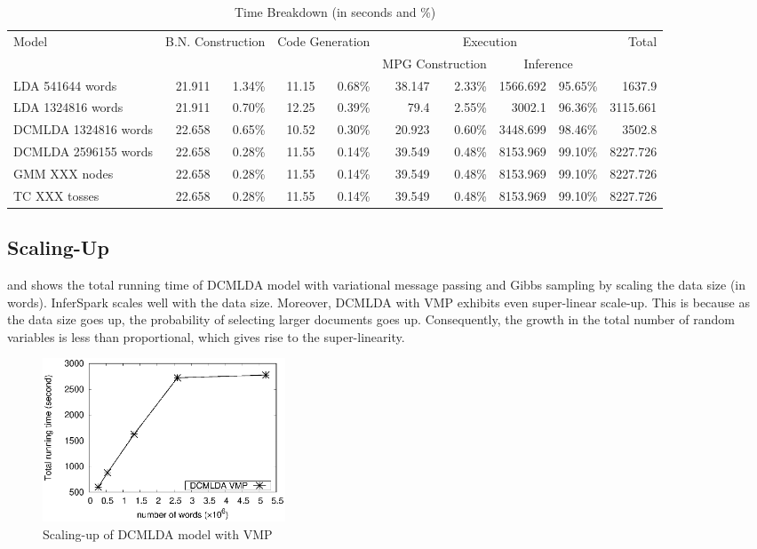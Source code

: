 \begin{table}
\caption{Time Breakdown (in seconds and \%)}
\label{breakdown}
\centering
\small
\begin{tabular}{|l||*{8}{r|}r|}
\hline
Model & \multicolumn{2}{c|}{B.N. Construction} & \multicolumn{2}{c|}{Code Generation}	& \multicolumn{4}{c|}{Execution} & Total \\\cline{6-9}
  & \multicolumn{2}{c|}{ } & \multicolumn{2}{c|}{ }	& \multicolumn{2}{c|}{MPG Construction} & \multicolumn{2}{c|}{Inference} &	 \\ \hline \hline
LDA 541644 words	& 21.911	& 1.34\%	& 11.15 &	0.68\%	& 38.147	& 2.33\% &	1566.692 & 95.65\%	& 1637.9 \\ \hline
LDA 1324816 words &	21.911 & 0.70\% & 12.25	& 0.39\% & 79.4 & 2.55\%	& 3002.1 & 96.36\% &	3115.661 \\ \hline
DCMLDA 1324816 words & 22.658 & 0.65\%	& 10.52 & 0.30\% &	20.923	& 0.60\% & 3448.699	& 98.46\% &	3502.8 \\ \hline
DCMLDA 2596155 words & 22.658 & 0.28\% & 11.55 & 0.14\%	& 39.549 & 0.48\%	& 8153.969 & 99.10\%	& 8227.726 \\ \hline
GMM XXX nodes & 22.658 & 0.28\% & 11.55 & 0.14\%	& 39.549 & 0.48\%	& 8153.969 & 99.10\%	& 8227.726 \\ \hline
TC XXX tosses & 22.658 & 0.28\% & 11.55 & 0.14\%	& 39.549 & 0.48\%	& 8153.969 & 99.10\%	& 8227.726 \\ \hline
\end{tabular}
\end{table}


\subsection{Scaling-Up}

 and  shows the total running time of DCMLDA model
with variational message passing and Gibbs sampling by scaling the data size (in words).
InferSpark scales well with the data size. Moreover, DCMLDA with VMP exhibits even super-linear scale-up.
This is because as the data size goes up, the probability of selecting larger documents goes up.
Consequently, the growth in the total number of random variables is less than proportional, which gives
rise to the super-linearity.

\begin{figure}[h]\centering
	\includegraphics[width=0.35\textwidth]{figs/exp_lda_datasize.eps}
	\caption{Scaling-up of DCMLDA model with VMP}
	\label{fig:scale-up-vmp}
\end{figure}


